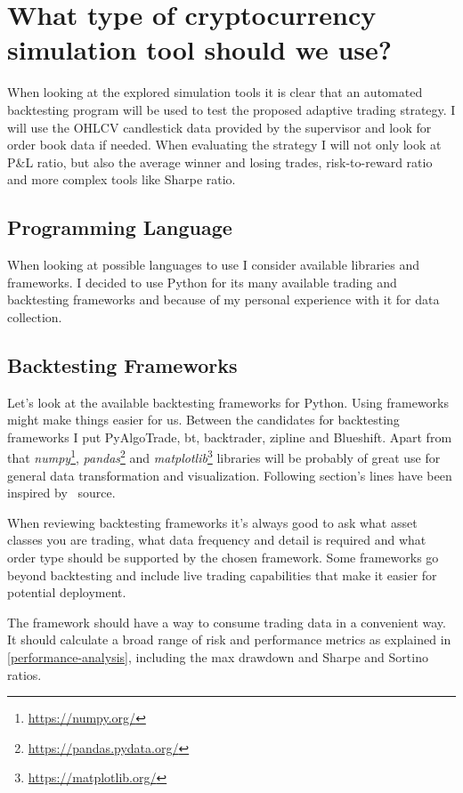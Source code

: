 \section{What type of cryptocurrency simulation tool should we use?}
When looking at the explored simulation tools it is clear that an automated backtesting program will be used to test the proposed adaptive trading strategy. I will use the OHLCV candlestick data provided by the supervisor and look for order book data if needed. When evaluating the strategy I will not only look at P\&L ratio, but also the average winner and losing trades, risk-to-reward ratio and more complex tools like Sharpe ratio.

\subsection*{Programming Language}
When looking at possible languages to use I consider available libraries and frameworks. I decided to use Python for its many available trading and backtesting frameworks and because of my personal experience with it for data collection.

\subsection*{Backtesting Frameworks}
Let's look at the available backtesting frameworks for Python. Using frameworks might make things easier for us. Between the candidates for backtesting frameworks I put PyAlgoTrade, bt, backtrader, zipline and Blueshift. Apart from that \emph{numpy}\footnote{\url{https://numpy.org/}}, \emph{pandas}\footnote{\url{https://pandas.pydata.org/}} and \emph{matplotlib}\footnote{\url{https://matplotlib.org/}} libraries will be probably of great use for general data transformation and visualization. Following section's lines have been inspired by~\cite{python-backtesting-frameworks} source.

When reviewing backtesting frameworks it's always good to ask what asset classes you are trading, what data frequency and detail is required and what order type should be supported by the chosen framework. Some frameworks go beyond backtesting and include live trading capabilities that make it easier for potential deployment.

The framework should have a way to consume trading data in a convenient way. It should calculate a broad range of risk and performance metrics as explained in \ref{performance-analysis}, including the max drawdown and Sharpe and Sortino ratios.

